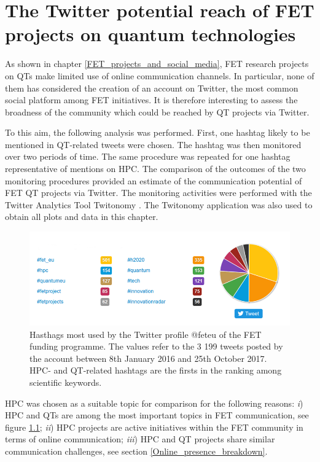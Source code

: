 \chapter{The Twitter potential reach of FET projects on quantum technologies}
As shown in chapter \ref{FET_projects_and_social_media}, FET research projects on QTs make limited use of online communication channels. In particular, none of them has considered the creation of an account on Twitter, the most common social platform among FET initiatives. It is therefore interesting to assess the broadness of the community which could be reached by QT projects via Twitter.

To this aim, the following analysis was performed. First, one hashtag likely to be mentioned in QT-related tweets were chosen. The hashtag was then monitored over two periods of time. The same procedure was repeated for one hashtag representative of mentions on HPC. The comparison of the outcomes of the two monitoring procedures provided an estimate of the communication potential of FET QT projects via Twitter. The monitoring activities were performed with the Twitter Analytics Tool Twitonomy \cite{Twitonomy}. The Twitonomy application was also used to obtain all plots and data in this chapter.

\begin{figure}[!t] 
 \begin{center}
 \includegraphics[scale=0.5]{Images/Hashtags_feteu.png}
 \caption{Hasthags most used by the Twitter profile @fet\textunderscore eu of the FET funding programme. The values refer to the 3 199 tweets posted by the account between 8th January 2016 and 25th October 2017. HPC- and QT-related hashtags are the firsts in the ranking among scientific keywords.}
 \label{Hashtags_feteu}
 \end{center}
\end{figure}

HPC was chosen as a suitable topic for comparison for the following reasons: \textit{i}) HPC and QTs are among the most important topics in FET communication, see figure \ref{Hashtags_feteu}; \textit{ii}) HPC projects are active initiatives within the FET community in terms of online communication; \textit{iii}) HPC and QT projects share similar communication challenges, see section \ref{Online_presence_breakdown}.

